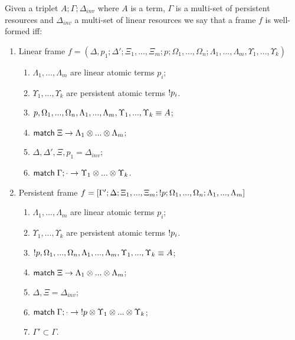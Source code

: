 \begin{definition}

Given a triplet $A; \Gamma; \Delta_{inv}$ where $A$ is a term, $\Gamma$ is a multi-set of persistent resources and $\Delta_{inv}$ a multi-set of linear resources we say that a frame $f$ is well-formed iff:

\begin{enumerate}
   \item Linear frame $f = (\Delta, p_1; \Delta'; \Xi_1, ..., \Xi_m; p; \Omega_1, ..., \Omega_n; \Lambda_1, ..., \Lambda_m, \Upsilon_1, ..., \Upsilon_k)$
   \begin{enumerate}
      \item $\Lambda_1, ..., \Lambda_m$ are linear atomic terms $p_i$;
      \item $\Upsilon_1, ..., \Upsilon_k$ are persistent atomic terms ${!} p_i$.
      \item $p, \Omega_1, ..., \Omega_n, \Lambda_1, ..., \Lambda_m, \Upsilon_1, ..., \Upsilon_k \equiv A$;
      \item $\mathsf{match} \; \Xi \rightarrow \Lambda_1 \otimes ... \otimes \Lambda_m$;
      \item $\Delta, \Delta', \Xi, p_1 = \Delta_{inv}$;
      \item $\mathsf{match} \; \Gamma; \cdot \rightarrow \Upsilon_1 \otimes ... \otimes \Upsilon_k$.
   \end{enumerate}
   \item Persistent frame $f = [\Gamma'; \Delta; \Xi_1, ..., \Xi_m; {!} p; \Omega_1, ..., \Omega_n; \Lambda_1, ..., \Lambda_m]$
      \begin{enumerate}
         \item $\Lambda_1, ..., \Lambda_m$ are linear atomic terms $p_i$;
         \item $\Upsilon_1, ..., \Upsilon_k$ are persistent atomic terms ${!} p_i$.
         \item ${!} p, \Omega_1, ..., \Omega_n, \Lambda_1, ..., \Lambda_m, \Upsilon_1, ..., \Upsilon_k \equiv A$;
         \item $\mathsf{match} \; \Xi \rightarrow \Lambda_1 \otimes ... \otimes \Lambda_m$;
         \item $\Delta, \Xi = \Delta_{inv}$;
         \item $\mathsf{match} \; \Gamma; \cdot \rightarrow {!} p \otimes \Upsilon_1 \otimes ... \otimes \Upsilon_k$;
         \item $\Gamma' \subset \Gamma$.
      \end{enumerate}
\end{enumerate}
\end{definition}

